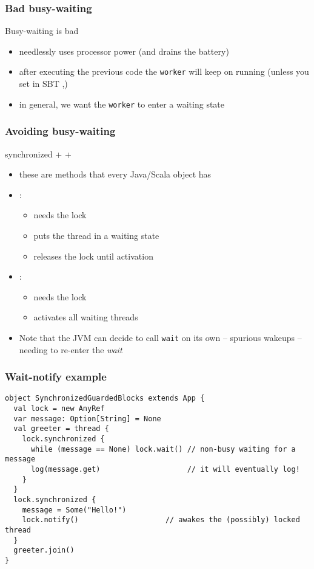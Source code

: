 \documentclass[aspectratio=169]{beamer}
\begin{document}
\begin{frame}\frametitle{Bad busy-waiting}
    
  \begin{block}{Busy-waiting is bad}
    \begin{itemize}
      \item needlessly uses processor power (and drains the battery)
      \item after executing the previous code the \texttt{worker} will keep on running (unless you set in SBT ,)
      \item in general, we want the \texttt{worker} to enter a waiting state
    \end{itemize}
    
  \end{block}
\end{frame}

\begin{frame}\frametitle{Avoiding busy-waiting}
\centering

{\Large \alert{synchronized} +  + }

\begin{itemize}
  \item these are methods that every Java/Scala object has
  \item {}:
    \begin{itemize}
      \item needs the lock
      \item puts the thread in a \alert{waiting} state
      \item releases the lock until activation
    \end{itemize}
  \item {}:
    \begin{itemize}
      \item needs the lock
      \item \alert{activates} all waiting threads
    \end{itemize}
  \pause
  \item Note that the JVM can decide to call \texttt{wait} on its own -- \alert{spurious wakeups} -- needing to re-enter the \emph{wait}
\end{itemize}
\end{frame}

\begin{frame}[fragile]\frametitle{Wait-notify example}
\begin{lstlisting}[emph={sleep,log,thread,join,wait,notify,synchronized}]
object SynchronizedGuardedBlocks extends App {
  val lock = new AnyRef
  var message: Option[String] = None
  val greeter = thread {
    lock.synchronized {
      while (message == None) lock.wait() // non-busy waiting for a message
      log(message.get)                    // it will eventually log!
    }
  }
  lock.synchronized {
    message = Some("Hello!")
    lock.notify()                    // awakes the (possibly) locked thread
  }
  greeter.join()
}
\end{lstlisting}
\end{frame}
\end{document}
